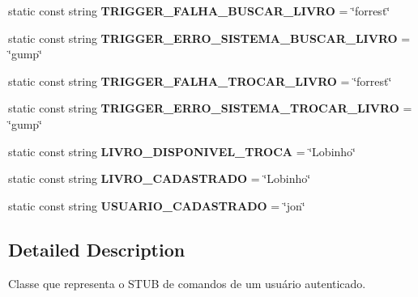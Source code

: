 \begin{DoxyCompactItemize}
static const string {\bfseries T\+R\+I\+G\+G\+E\+R\+\_\+\+F\+A\+L\+H\+A\+\_\+\+B\+U\+S\+C\+A\+R\+\_\+\+L\+I\+V\+RO} = \char`\"{}forrest\char`\"{}
\item 
\mbox{\label{classSTUBComandosusuarioautenticado_a29ead874532d57f9f1b86f8c287f813a}} 
static const string {\bfseries T\+R\+I\+G\+G\+E\+R\+\_\+\+E\+R\+R\+O\+\_\+\+S\+I\+S\+T\+E\+M\+A\+\_\+\+B\+U\+S\+C\+A\+R\+\_\+\+L\+I\+V\+RO} = \char`\"{}gump\char`\"{}
\item 
\mbox{\label{classSTUBComandosusuarioautenticado_a6af222cd1eff0bac96ab7194d496c903}} 
static const string {\bfseries T\+R\+I\+G\+G\+E\+R\+\_\+\+F\+A\+L\+H\+A\+\_\+\+T\+R\+O\+C\+A\+R\+\_\+\+L\+I\+V\+RO} = \char`\"{}forrest\char`\"{}
\item 
\mbox{\label{classSTUBComandosusuarioautenticado_ada4a785006c657fb829db2b2f764af4d}} 
static const string {\bfseries T\+R\+I\+G\+G\+E\+R\+\_\+\+E\+R\+R\+O\+\_\+\+S\+I\+S\+T\+E\+M\+A\+\_\+\+T\+R\+O\+C\+A\+R\+\_\+\+L\+I\+V\+RO} = \char`\"{}gump\char`\"{}
\item 
\mbox{\label{classSTUBComandosusuarioautenticado_a5488361abe4431ae3f37b57f45d11f1f}} 
static const string {\bfseries L\+I\+V\+R\+O\+\_\+\+D\+I\+S\+P\+O\+N\+I\+V\+E\+L\+\_\+\+T\+R\+O\+CA} = \char`\"{}Lobinho\char`\"{}
\item 
\mbox{\label{classSTUBComandosusuarioautenticado_a6f5b109074186321b63b1bbb55be8b88}} 
static const string {\bfseries L\+I\+V\+R\+O\+\_\+\+C\+A\+D\+A\+S\+T\+R\+A\+DO} = \char`\"{}Lobinho\char`\"{}
\item 
\mbox{\label{classSTUBComandosusuarioautenticado_a3fae6f1d9ef8d902f72f6bcd9044a3c3}} 
static const string {\bfseries U\+S\+U\+A\+R\+I\+O\+\_\+\+C\+A\+D\+A\+S\+T\+R\+A\+DO} = \char`\"{}jon\char`\"{}
\end{DoxyCompactItemize}


\subsection{Detailed Description}
Classe que representa o S\+T\+UB de comandos de um usuário autenticado. 

